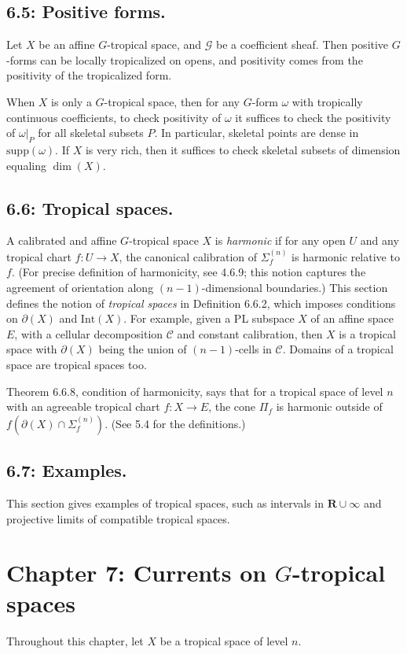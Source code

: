 \documentclass[12pt,reqno]{amsart}
\theoremstyle{definition}
\theoremstyle{remark}
\theoremstyle{citedrem}
\theoremstyle{cited}
\theoremstyle{citeddef}
\theoremstyle{step}
\begin{document}
\subsection*{6.5: Positive forms.} Let $X$ be an affine $G$-tropical space, and $\mathcal{G}$ be a coefficient sheaf. Then positive $G$-forms can be locally tropicalized on opens, and positivity comes from the positivity of the tropicalized form. 

When $X$ is only a $G$-tropical space, then for any $G$-form $\omega$ with tropically continuous coefficients, to check positivity of $\omega$ it suffices to check the positivity of $\omega|_P$ for all skeletal subsets $P$. In particular, skeletal points are dense in $\mathrm{supp}(\omega)$. If $X$ is very rich, then it suffices to check skeletal subsets of dimension equaling $\dim(X)$.

\subsection*{6.6: Tropical spaces. }A calibrated and affine $G$-tropical space $X$ is \emph{harmonic} if for any open $U$ and any tropical chart $f \colon U \to X$, the canonical calibration of $\Sigma_f^{(n)}$ is harmonic relative to $f$. (For precise definition of harmonicity, see 4.6.9; this notion captures the agreement of orientation along $(n-1)$-dimensional boundaries.) This section defines the notion of \emph{tropical spaces} in Definition 6.6.2, which imposes conditions on $\partial(X)$ and $\mathrm{Int}(X)$. For example, given a PL subspace $X$ of an affine space $E$, with a cellular decomposition $\mathcal{C}$ and constant calibration, then $X$ is a tropical space with $\partial(X)$ being the union of $(n-1)$-cells in $\mathcal{C}$. Domains of a tropical space are tropical spaces too. 

Theorem 6.6.8, condition of harmonicity, says that for a tropical space of level $n$ with an agreeable tropical chart $f \colon X \to E$, the cone $\Pi_f$ is harmonic outside of $f(\partial(X) \cap \Sigma_f^{(n)})$. (See 5.4 for the definitions.) 

\subsection*{6.7: Examples.} This section gives examples of tropical spaces, such as intervals in $\mathbf{R} \cup \infty$ and projective limits of compatible tropical spaces. 

\section*{Chapter 7: Currents on $G$-tropical spaces}
Throughout this chapter, let $X$ be a tropical space of level $n$.
\end{document}

